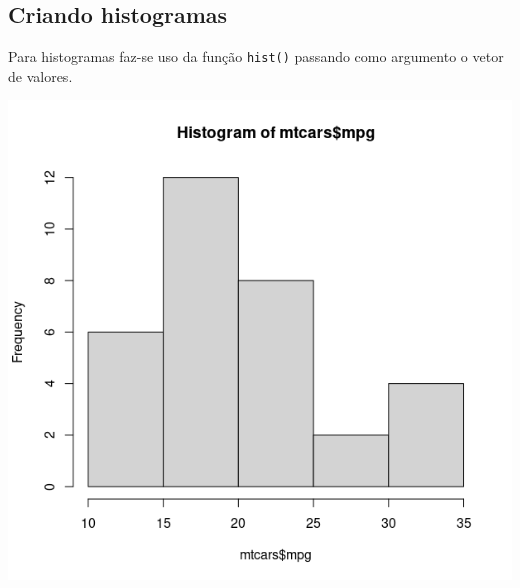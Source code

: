 \documentclass[
]{book}
\newenvironment{Shaded}{\begin{snugshade}}{\end{snugshade}}
\newcommand{\AttributeTok}[1]{\textcolor[rgb]{0.77,0.63,0.00}{#1}}
\newcommand{\CommentTok}[1]{\textcolor[rgb]{0.56,0.35,0.01}{\textit{#1}}}
\newcommand{\DecValTok}[1]{\textcolor[rgb]{0.00,0.00,0.81}{#1}}
\newcommand{\FunctionTok}[1]{\textcolor[rgb]{0.00,0.00,0.00}{#1}}
\newcommand{\NormalTok}[1]{#1}
\newcommand{\SpecialCharTok}[1]{\textcolor[rgb]{0.00,0.00,0.00}{#1}}
\begin{document}
\hypertarget{criando-histogramas}{%
\subsection{Criando histogramas}\label{criando-histogramas}}

Para histogramas faz-se uso da função \texttt{hist()} passando como argumento o vetor de valores.

\begin{Shaded}
\end{Shaded}

\includegraphics{figure/g7.png}

\begin{Shaded}
\end{Shaded}
\end{document}
